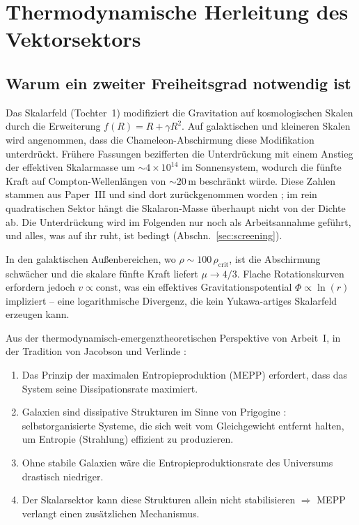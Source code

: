 \documentclass[aps,prd,twocolumn,superscriptaddress,nofootinbib]{revtex4-2}
\begin{document}
\section{Thermodynamische Herleitung des Vektorsektors}
\label{sec:derivation}

\subsection{Warum ein zweiter Freiheitsgrad notwendig ist}
\label{sec:why_vector}

Das Skalarfeld (Tochter~1) modifiziert die Gravitation auf kosmologischen Skalen durch die Erweiterung $f(R) = R + \gamma R^2$. Auf galaktischen und kleineren Skalen wird angenommen, dass die Chameleon-Abschirmung diese Modifikation unterdr\"uckt. Fr\"uhere Fassungen bezifferten die Unterdr\"uckung mit einem Anstieg der effektiven Skalarmasse um $\sim 4 \times 10^{14}$ im Sonnensystem, wodurch die f\"unfte Kraft auf Compton-Wellenl\"angen von $\sim 20$\,m beschr\"ankt w\"urde. Diese Zahlen stammen aus Paper~III und sind dort zur\"uckgenommen worden \cite{Geiger2026c}; im rein quadratischen Sektor h\"angt die Skalaron-Masse \"uberhaupt nicht von der Dichte ab. Die Unterdr\"uckung wird im Folgenden nur noch als Arbeitsannahme gef\"uhrt, und alles, was auf ihr ruht, ist bedingt (Abschn.~\ref{sec:screening}).

In den galaktischen Au\ss{}enbereichen, wo $\rho \sim 100\,\rho_{\mathrm{crit}}$, ist die Abschirmung schw\"acher und die skalare f\"unfte Kraft liefert $\mu \to 4/3$. Flache Rotationskurven erfordern jedoch $v \propto \mathrm{const}$, was ein effektives Gravitationspotential $\Phi \propto \ln(r)$ impliziert -- eine logarithmische Divergenz, die kein Yukawa-artiges Skalarfeld erzeugen kann.

Aus der thermodynamisch-emergenztheoretischen Perspektive von Arbeit~I, in der Tradition von Jacobson und Verlinde \cite{Jacobson1995,Verlinde2017}:
\begin{enumerate}
\item Das Prinzip der maximalen Entropieproduktion (MEPP) \cite{Dewar2003,Martyushev2006} erfordert, dass das System seine Dissipationsrate maximiert.
\item Galaxien sind dissipative Strukturen im Sinne von Prigogine \cite{Prigogine1977}: selbstorganisierte Systeme, die sich weit vom Gleichgewicht entfernt halten, um Entropie (Strahlung) effizient zu produzieren.
\item Ohne stabile Galaxien w\"are die Entropieproduktionsrate des Universums drastisch niedriger.
\item Der Skalarsektor kann diese Strukturen allein nicht stabilisieren $\Rightarrow$ MEPP verlangt einen zus\"atzlichen Mechanismus.
\end{enumerate}
\end{document}
